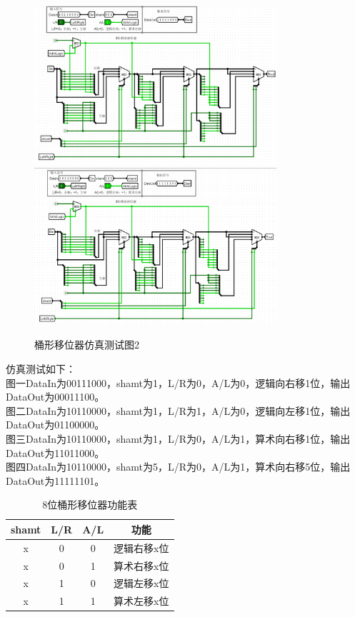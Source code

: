\documentclass{article}
\begin{document}
    \begin{figure}[H]
    \centering
    \includegraphics[width=0.8\textwidth]{6.5.3.png}
    \includegraphics[width=0.8\textwidth]{6.5.4.png}
    \caption{桶形移位器仿真测试图2}
    \end{figure}
    仿真测试如下：\\
    图一DataIn为00111000，shamt为1，L/R为0，A/L为0，逻辑向右移1位，输出DataOut为00011100。\\
    图二DataIn为10110000，shamt为1，L/R为1，A/L为0，逻辑向左移1位，输出DataOut为01100000。\\
    图三DataIn为10110000，shamt为1，L/R为0，A/L为1，算术向右移1位，输出DataOut为11011000。\\
    图四DataIn为10110000，shamt为5，L/R为0，A/L为1，算术向右移5位，输出DataOut为11111101。

    \begin{table}[H]
    \centering
    \begin{tabular}{|c|c|c|c|}
        \hline
        shamt & L/R & A/L & 功能 \\ \hline
        x & 0 & 0 & 逻辑右移x位 \\ \hline
        x & 0 & 1 & 算术右移x位 \\ \hline
        x & 1 & 0 & 逻辑左移x位 \\ \hline
        x & 1 & 1 & 算术左移x位 \\ \hline
    \end{tabular}
    \caption{8位桶形移位器功能表}
    \end{table}
\end{document}
